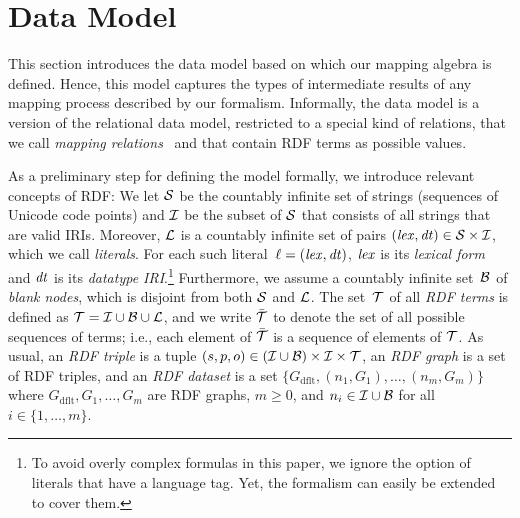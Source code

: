 \vspace{-2mm} %
\enlargethispage{\baselineskip}%

\section{Data Model}
\label{sec:data_model}

\vspace{-2mm} %

This section introduces the data model
based on which our mapping algebra is defined.
Hence, this model captures the types of intermediate results of any mapping process
described by our formalism.
%
Informally, the data model is a version of the relational data model, restricted to a special kind of relations, that we call \emph{mapping relations}%
\ and that contain RDF terms as possible values.

As a preliminary step for defining the model formally, we introduce relevant concepts of RDF:
We let $\mathcal{S}$ be the countably infinite set of strings (sequences of
Unicode code points) and $\mathcal{I}$ be the subset of $\mathcal{S}$ that
consists of all strings that are valid IRIs.
Moreover, $\mathcal{L}$ is a countably infinite set of pairs
$ (\mathit{lex}, \mathit{dt}) \in \mathcal{S} \times \mathcal{I}$, which we
call \emph{literals}.
For each such literal~$\ell = (\mathit{lex}, \mathit{dt})$, $\mathit{lex}$ is
its \emph{lexical form} and $\mathit{dt}$ is its \emph{datatype IRI}.\footnote{To avoid overly complex formulas in this paper, we ignore the option of literals that have a language tag. Yet, the formalism can easily be extended to cover
	them.}
Furthermore, we assume a countably infinite set~$\mathcal{B}$ of \emph{blank
	nodes}, which is disjoint from both $\mathcal{S}$ and $\mathcal{L}$.
The set~$\mathcal{T}$ of all \emph{RDF terms} is defined as
$\mathcal{T} = \mathcal{I} \cup \mathcal{B} \cup \mathcal{L}$, and
we write $\bar{\mathcal{T}}$ to denote the set of all possible sequences of
terms; i.e., each element of $\bar{\mathcal{T}}$ is a sequence of elements of
$\mathcal{T}$.
As usual, an \emph{RDF triple} is a tuple $(s,p,o) \in (\mathcal{I} \cup \mathcal{B}) \times \mathcal{I} \times \mathcal{T}$, an \emph{RDF graph} is a set of RDF triples, and an \emph{RDF dataset} is a set $\big\{ G_\mathrm{dflt}, (n_1,G_1), \ldots, (n_m,G_m) \big\}$ where $G_\mathrm{dflt}, G_1, \ldots, G_m$ are RDF graphs, $m \geq 0$, and $n_i \in \mathcal{I} \cup \mathcal{B}$ for all $i \in \{1,\ldots,m\}$.


